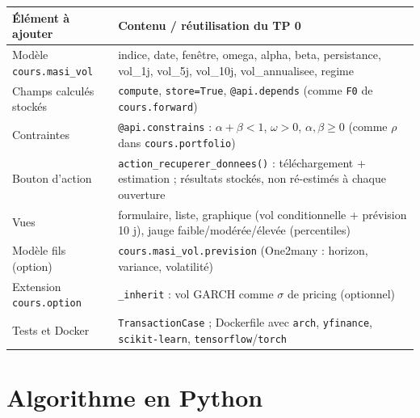 \documentclass[10pt,a4paper]{article}
\begin{document}
\begin{tabularx}{\linewidth}{@{}>{\raggedright\arraybackslash}p{4.2cm} X@{}}
\toprule
\textbf{Élément à ajouter} & \textbf{Contenu / réutilisation du TP 0} \\
\midrule
Modèle \texttt{cours.masi\_vol} & indice, date, fenêtre, omega, alpha, beta, persistance, vol\_1j, vol\_5j, vol\_10j, vol\_annualisee, regime \\
Champs calculés stockés & \texttt{compute}, \texttt{store=True}, \texttt{@api.depends} (comme \texttt{F0} de \texttt{cours.forward}) \\
Contraintes & \texttt{@api.constrains} : $\alpha+\beta<1$, $\omega>0$, $\alpha,\beta\ge0$ (comme $\rho$ dans \texttt{cours.portfolio}) \\
Bouton d'action & \texttt{action\_recuperer\_donnees()} : téléchargement + estimation ; résultats stockés, non ré-estimés à chaque ouverture \\
Vues & formulaire, liste, graphique (vol conditionnelle + prévision 10 j), jauge faible/modérée/élevée (percentiles) \\
Modèle fils (option) & \texttt{cours.masi\_vol.prevision} (One2many : horizon, variance, volatilité) \\
Extension \texttt{cours.option} & \texttt{\_inherit} : vol GARCH comme $\sigma$ de pricing (optionnel) \\
Tests et Docker & \texttt{TransactionCase} ; Dockerfile avec \texttt{arch}, \texttt{yfinance}, \texttt{scikit-learn}, \texttt{tensorflow}/\texttt{torch} \\
\bottomrule
\end{tabularx}

\section{Algorithme en Python}
\end{document}
